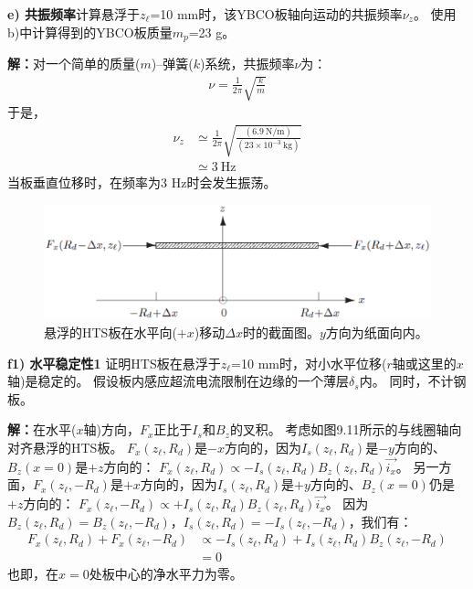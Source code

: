 \textbf{e) 共振频率}\qquad 计算悬浮于$z_\ell$=10 mm时，该YBCO板轴向运动的共振频率$\nu_z$。
使用b)中计算得到的YBCO板质量$m_p$=23 g。

\textbf{解：}对一个简单的质量($m$)--弹簧($k$)系统，共振频率$\nu$为：
\begin{align*}%
\nu=\frac{1}{2\pi}\sqrt{\frac{k}{m}}
\end{align*}
于是，
\begin{align*}%
\nu_{z}&\simeq\frac{1}{2\pi}\sqrt{\frac{(6.9\ \mathrm{N/m})}{(23\times 10^{-3}\ \mathrm{kg})}}\\
&\simeq 3\ \mathrm{Hz}
\end{align*}
当板垂直位移时，在频率为3 Hz时会发生振荡。

\begin{figure}
	\centering
	\includegraphics[scale=0.5]{chpt9/figs/fig9.14.eps}
	\caption{悬浮的HTS板在水平向($+x$)移动$\Delta x$时的截面图。$y$方向为纸面向内。}
\end{figure}

\textbf{f1) 水平稳定性1}\qquad
证明HTS板在悬浮于$z_\ell$=10 mm时，对小水平位移($r$轴或这里的$x$轴)是稳定的。
假设板内感应超流电流限制在边缘的一个薄层$\delta_s$内。
同时，不计钢板。

\textbf{解：}在水平($x$轴)方向，$F_x$正比于$I_s$和$B_z$的叉积。
考虑如图9.11所示的与线圈轴向对齐悬浮的HTS板。
$F_x(z_\ell,R_d)$是$-x$方向的，因为$I_s(z_\ell,R_d)$是$-y$方向的、$B_z(x=0)$是$+z$方向的：
$F_x(z_\ell,R_d)\propto -I_s(z_\ell,R_d)B_z(z_\ell,R_d)\vec{i_x}$。
另一方面，$F_x(z_\ell,-R_d)$是$+x$方向的，因为$I_s(z_\ell,R_d)$是$+y$方向的、$B_z(x=0)$仍是$+z$方向的：
$F_x(z_\ell,-R_d)\propto +I_s(z_\ell,R_d)B_z(z_\ell,R_d)\vec{i_x}$。
因为$B_z(z_\ell,R_d)=B_z(z_\ell,-R_d)$，$I_s(z_\ell,R_d)=-I_s(z_\ell,-R_d)$，我们有：
\begin{align*}%
F_{x}(z_{\ell},R_{d})+F_{x}(z_{\ell},-R_{d})&\propto-I_{s}(z_{\ell},R_{d})+I_{s}(z_{\ell},R_{d})B_{z}(z_{\ell},-R_{d})\\
&=0
\end{align*}
也即，在$x=0$处板中心的净水平力为零。

